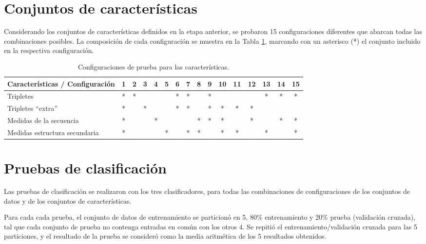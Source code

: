 \documentclass[12pt,bibliography=oldstyle,DIV=12,parskip=half-,titlepage]{scrartcl}
\begin{document}
\section{Conjuntos de características}
Considerando los conjuntos de características definidos en la etapa anterior,
se probaron 15 configuraciones diferentes que abarcan todas las combinaciones
posibles. La composición de cada configuración se muestra en la Tabla
\ref{featsets}, marcando con un asterisco (*) el conjunto incluido en la respectiva configuración.

\begin{table}[H]
  \caption{Configuraciones de prueba para las características.}
  \center%
  \begin{tabular}{lccccccccccccccc}\toprule
Características / Configuración & 1& 2& 3& 4& 5& 6& 7& 8& 9&10&11&12&13&14&15\\
\midrule
Tripletes                       & *& *&  &  &  & *& *&  & *&  &  &  & *& *& *\\
Tripletes ``extra''             & *&  & *&  &  & *& *&  & *& *& *& *&  &  &  \\
Medidas de la secuencia         & *&  &  & *&  &  &  & *& *& *&  & *&  & *& *\\
Medidas estructura secundaria   & *&  &  &  & *&  & *& *&  & *& *&  & *&  & *\\
\bottomrule
  \end{tabular}
  \label{featsets}
\end{table}


\section{Pruebas de clasificación}

Las pruebas de clasificación se realizaron con los tres
clasificadores, para todas las combinaciones de configuraciones de los
conjuntos de datos y de los conjuntos de características.

Para cada cada prueba, el conjunto de datos de entrenamiento se
particionó en 5, 80\% entrenamiento y 20\% prueba (validación
cruzada), tal que cada conjunto de prueba no contenga entradas en
común con los otros 4. Se repitió el entrenamiento/validación cruzada
para las 5 particiones, y el resultado de la prueba se consideró como
la media aritmética de los 5 resultados obtenidos.
\end{document}
